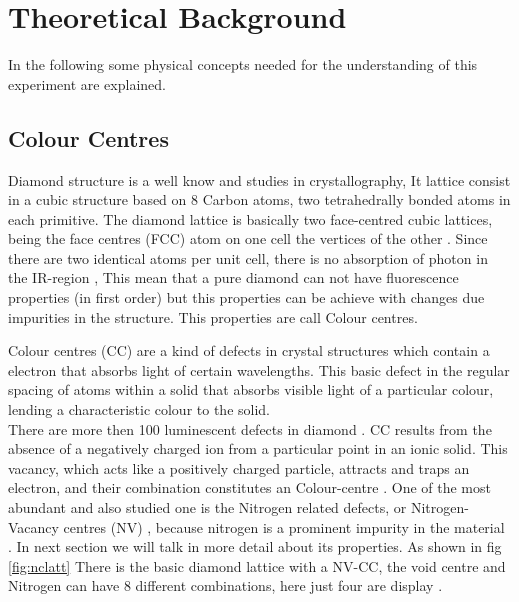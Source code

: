 \section{Theoretical Background}
In the following some physical concepts needed for the understanding of this experiment are explained.
\subsection{Colour Centres}

Diamond structure is a well know and studies in crystallography, It lattice consist in a cubic structure based on 8 Carbon atoms, two tetrahedrally bonded atoms in each primitive. The diamond lattice is basically two face-centred cubic lattices, being the face centres (FCC) atom on one cell the vertices of the other \cite{sir_c_v_raman_crystal_1944}. Since there are two  identical atoms per unit cell, there is no absorption of photon in the IR-region  \cite{mildren_1_nodate}, This mean that a pure diamond can not have fluorescence properties (in first order) but this properties can be achieve with changes due impurities in the structure. This properties are call Colour centres.

Colour centres (CC) are a kind of defects in crystal structures which contain a electron that absorbs light of certain wavelengths.\cite{lesik_engineering_2015} This basic defect in the regular spacing of atoms within a solid that absorbs visible light of a particular colour, lending a characteristic colour to the solid. \\

There are more then 100 luminescent defects in diamond \cite{jelezko_single_2006}. CC results from the absence of a negatively charged ion from a particular point in an ionic solid. This vacancy, which acts like a positively charged particle, attracts and traps an electron, and their combination constitutes an Colour-centre \cite{choudhury_principles_2014}. One of the most abundant and also  studied one is the  Nitrogen related defects, or Nitrogen-Vacancy centres (NV) , because  nitrogen is a prominent impurity in the material . In next section we will talk in more detail about its properties. As shown in fig \ref{fig:nclatt} There is the basic diamond lattice  with a NV-CC, the void centre and Nitrogen can have 8 different combinations, here just four are display \cite{pham_magnetic_nodate}.



